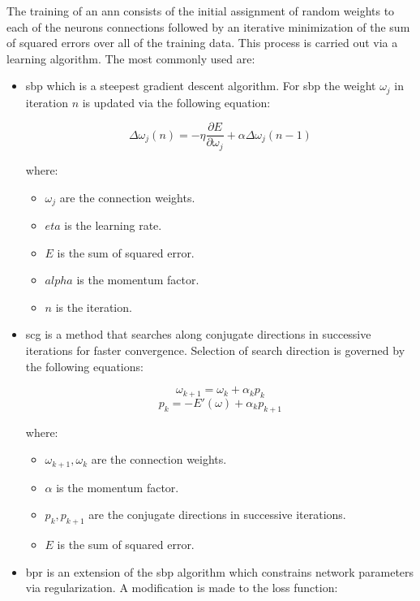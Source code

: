 The training of an \gls{ann} consists of the initial assignment of random weights to each of the neurons connections followed by an iterative minimization of the sum of squared errors over all of the training data. This process is carried out via a learning algorithm. The most commonly used are:
\begin{itemize}
    \item \Gls{sbp} which is a steepest gradient descent algorithm. For \gls{sbp} the weight $\omega_{j}$ in iteration $n$ is updated via the following equation:

$$\Delta\omega_{j}(n) = -\eta\frac{\partial E}{\partial \omega_{j}}+\alpha\Delta\omega_{j}(n-1)$$

    where:
        \begin{itemize}
            \item $\omega_{j}$ are the connection weights.
            \item $eta$ is the learning rate.
            \item $E$ is the sum of squared error.
            \item $alpha$ is the momentum factor.
            \item $n$ is the iteration.
        \end{itemize}

    \item \Gls{scg} is a method that searches along conjugate directions in successive iterations for faster convergence. Selection of search direction is governed by the following equations:

        $$\omega_{k+1} = \omega_{k} + \alpha_{k}p_{k}$$
        $$p_{k} = -E'(\omega) + \alpha_{k}p_{k+1}$$

        where:
        \begin{itemize}
            \item $\omega_{k+1}, \omega_{k}$ are the connection weights.
            \item $\alpha$ is the momentum factor.
            \item $p_{k}, p_{k+1}$ are the conjugate directions in successive iterations.
            \item $E$ is the sum of squared error.
        \end{itemize}

    \item \Gls{bpr} is an extension of the \gls{sbp} algorithm which constrains network parameters via regularization. A modification is made to the loss function:


\end{itemize}
